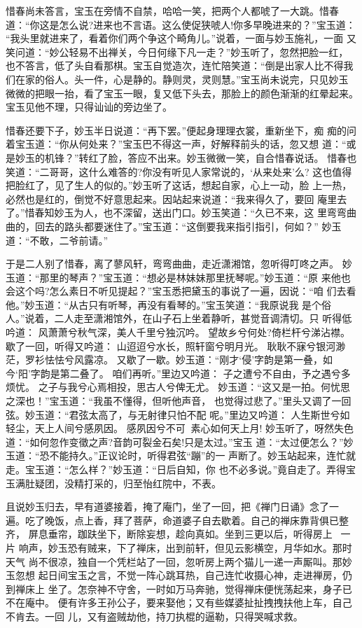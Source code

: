 惜春尚未答言，宝玉在旁情不自禁，哈哈一笑，把两个人都唬了一大跳。惜春
道：“你这是怎么说?进来也不言语。这么使促狭唬人!你多早晚进来的？”宝玉道：
“我头里就进来了，看着你们两个争这个畸角儿。”说着，一面与妙玉施礼，一面
又笑问道：“妙公轻易不出禅关，今日何缘下凡一走？”妙玉听了，忽然把脸一红，
也不答言，低了头自看那棋。宝玉自觉造次，连忙陪笑道：“倒是出家人比不得我
们在家的俗人。头一件，心是静的。静则灵，灵则慧。”宝玉尚未说完，只见妙玉
微微的把眼一抬，看了宝玉一眼，复又低下头去，那脸上的颜色渐渐的红晕起来。
宝玉见他不理，只得讪讪的旁边坐了。

惜春还要下子，妙玉半日说道：“再下罢。”便起身理理衣裳，重新坐下，痴
痴的问着宝玉道：“你从何处来？”宝玉巴不得这一声，好解释前头的话，忽又想
道：“或是妙玉的机锋？”转红了脸，答应不出来。妙玉微微一笑，自合惜春说话。
惜春也笑道：“二哥哥，这什么难答的?你没有听见人家常说的，‘从来处来’么?
这也值得把脸红了，见了生人的似的。”妙玉听了这话，想起自家，心上一动，脸
上一热，必然也是红的，倒觉不好意思起来。因站起来说道：“我来得久了，要回
庵里去了。”惜春知妙玉为人，也不深留，送出门口。妙玉笑道：“久已不来，这
里弯弯曲曲的，回去的路头都要迷住了。”宝玉道：“这倒要我来指引指引，何如？”
妙玉道：“不敢，二爷前请。”

于是二人别了惜春，离了蓼风轩，弯弯曲曲，走近潇湘馆，忽听得叮咚之声。
妙玉道：“那里的琴声？”宝玉道：“想必是林妹妹那里抚琴呢。”妙玉道：“原
来他也会这个吗?怎么素日不听见提起？”宝玉悉把黛玉的事说了一遍，因说：“咱
们去看他。”妙玉道：“从古只有听琴，再没有看琴的。”宝玉笑道：“我原说我
是个俗人。”说着，二人走至潇湘馆外，在山子石上坐着静听，甚觉音调清切。只
听得低吟道：
风萧萧兮秋气深，美人千里兮独沉吟。
望故乡兮何处?倚栏杆兮涕沾襟。
歇了一回，听得又吟道：
山迢迢兮水长，照轩窗兮明月光。
耿耿不寐兮银河渺茫，罗衫怯怯兮风露凉。
又歇了一歇。妙玉道：“刚才‘侵’字韵是第一叠，如今‘阳’字韵是第二叠了。
咱们再听。”里边又吟道：
子之遭兮不自由，予之遇兮多烦忧。
之子与我兮心焉相投，思古人兮俾无尤。
妙玉道：“这又是一拍。何忧思之深也！”宝玉道：“我虽不懂得，但听他声音，
也觉得过悲了。”里头又调了一回弦。妙玉道：“君弦太高了，与无射律只怕不配
呢。”里边又吟道：
人生斯世兮如轻尘，天上人间兮感夙因。
感夙因兮不可，素心如何天上月!
妙玉听了，呀然失色道：“如何忽作变徵之声?音韵可裂金石矣!只是太过。”宝玉
道：“太过便怎么？”妙玉道：“恐不能持久。”正议论时，听得君弦“蹦”的一
声断了。妙玉站起来，连忙就走。宝玉道：“怎么样？”妙玉道：“日后自知，你
也不必多说。”竟自走了。弄得宝玉满肚疑团，没精打采的，归至怡红院中，不表。

且说妙玉归去，早有道婆接着，掩了庵门，坐了一回，把《禅门日诵》念了一
遍。吃了晚饭，点上香，拜了菩萨，命道婆子自去歇着。自己的禅床靠背俱已整齐，
屏息垂帘，跏趺坐下，断除妄想，趁向真如。坐到三更以后，听得房上一片
响声，妙玉恐有贼来，下了禅床，出到前轩，但见云影横空，月华如水。那时天气
尚不很凉，独自一个凭栏站了一回，忽听房上两个猫儿一递一声厮叫。那妙玉忽想
起日间宝玉之言，不觉一阵心跳耳热，自己连忙收摄心神，走进禅房，仍到禅床上
坐了。怎奈神不守舍，一时如万马奔驰，觉得禅床便恍荡起来，身子已不在庵中。
便有许多王孙公子，要来娶他；又有些媒婆扯扯拽拽扶他上车，自己不肯去。一回
儿，又有盗贼劫他，持刀执棍的逼勒，只得哭喊求救。

